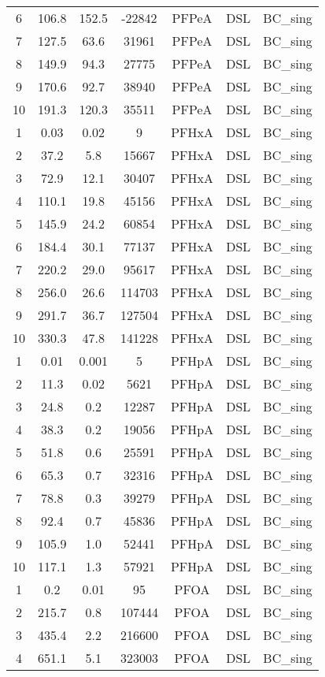 \begin{longtable}[c]{ccccccc}
6 & 106.8 & 152.5 & -22842 & PFPeA & DSL & BC\_sing \\
7 & 127.5 & 63.6 & 31961 & PFPeA & DSL & BC\_sing \\
8 & 149.9 & 94.3 & 27775 & PFPeA & DSL & BC\_sing \\
9 & 170.6 & 92.7 & 38940 & PFPeA & DSL & BC\_sing \\
10 & 191.3 & 120.3 & 35511 & PFPeA & DSL & BC\_sing \\
1 & 0.03 & 0.02 & 9 & PFHxA & DSL & BC\_sing \\
2 & 37.2 & 5.8 & 15667 & PFHxA & DSL & BC\_sing \\
3 & 72.9 & 12.1 & 30407 & PFHxA & DSL & BC\_sing \\
4 & 110.1 & 19.8 & 45156 & PFHxA & DSL & BC\_sing \\
5 & 145.9 & 24.2 & 60854 & PFHxA & DSL & BC\_sing \\
6 & 184.4 & 30.1 & 77137 & PFHxA & DSL & BC\_sing \\
7 & 220.2 & 29.0 & 95617 & PFHxA & DSL & BC\_sing \\
8 & 256.0 & 26.6 & 114703 & PFHxA & DSL & BC\_sing \\
9 & 291.7 & 36.7 & 127504 & PFHxA & DSL & BC\_sing \\
10 & 330.3 & 47.8 & 141228 & PFHxA & DSL & BC\_sing \\
1 & 0.01 & 0.001 & 5 & PFHpA & DSL & BC\_sing \\
2 & 11.3 & 0.02 & 5621 & PFHpA & DSL & BC\_sing \\
3 & 24.8 & 0.2 & 12287 & PFHpA & DSL & BC\_sing \\
4 & 38.3 & 0.2 & 19056 & PFHpA & DSL & BC\_sing \\
5 & 51.8 & 0.6 & 25591 & PFHpA & DSL & BC\_sing \\
6 & 65.3 & 0.7 & 32316 & PFHpA & DSL & BC\_sing \\
7 & 78.8 & 0.3 & 39279 & PFHpA & DSL & BC\_sing \\
8 & 92.4 & 0.7 & 45836 & PFHpA & DSL & BC\_sing \\
9 & 105.9 & 1.0 & 52441 & PFHpA & DSL & BC\_sing \\
10 & 117.1 & 1.3 & 57921 & PFHpA & DSL & BC\_sing \\
1 & 0.2 & 0.01 & 95 & PFOA & DSL & BC\_sing \\
2 & 215.7 & 0.8 & 107444 & PFOA & DSL & BC\_sing \\
3 & 435.4 & 2.2 & 216600 & PFOA & DSL & BC\_sing \\
4 & 651.1 & 5.1 & 323003 & PFOA & DSL & BC\_sing \\

\end{longtable}

